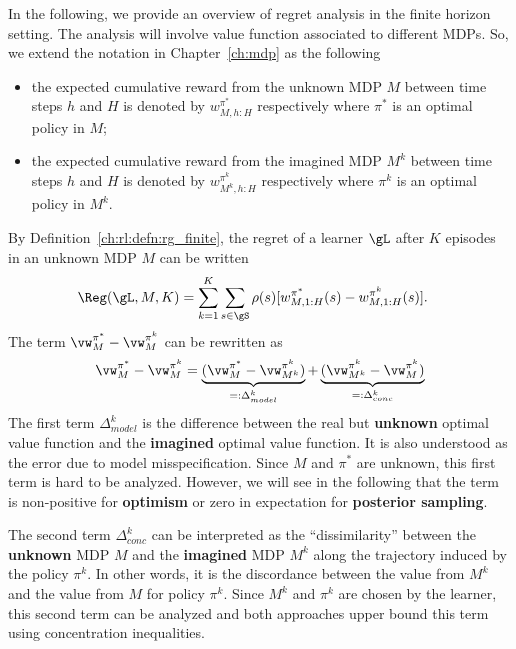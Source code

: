 In the following, we provide an overview of regret analysis in the finite horizon setting. 
The analysis will involve value function associated to different MDPs.
So, we extend the notation in Chapter~\ref{ch:mdp} as the following
\begin{itemize}
    \item the expected cumulative reward from the unknown MDP $M$ between time steps $h$ and $H$ is denoted by $w^{\pi^*}_{M,h:H}$ respectively where $\pi^*$ is an optimal policy in $M$;
    \item the expected cumulative reward from the imagined MDP $M^k$ between time steps $h$ and $H$ is denoted by $w^{\pi^k}_{M^k,h:H}$ respectively where $\pi^k$ is an optimal policy in $M^k$.
\end{itemize}

By Definition~\ref{ch:rl:defn:rg_finite}, the regret of a learner $\gL$ after $K$ episodes in an unknown MDP $M$ can be written
\begin{align*}
    \Reg(\gL, M, K) &= \sum_{k=1}^K\sum_{s\in\gS}\rho(s)[w^{\pi^*}_{M,1:H}(s) -w^{\pi^k}_{M,1:H}(s)].
\end{align*}
The term $\vw^{\pi^*}_M -\vw^{\pi^k}_M$ can be rewritten as
\begin{equation}
    \label{eq:rg_model_conc}
    \vw^{\pi^*}_M -\vw^{\pi^k}_M = \underbrace{(\vw^{\pi^*}_M -\vw^{\pi^k}_{M^k})}_{=:\Delta_{model}^k} +\underbrace{(\vw^{\pi^k}_{M^k} -\vw^{\pi^k}_M)}_{=:\Delta_{conc}^k}
\end{equation}
The first term $\Delta_{model}^k$ is the difference between the real but \textbf{unknown} optimal value function and the \textbf{imagined} optimal value function.
It is also understood as the error due to model misspecification.
Since $M$ and $\pi^*$ are unknown, this first term is hard to be analyzed.
However, we will see in the following that the term is non-positive for \textbf{optimism} or zero in expectation for \textbf{posterior sampling}.

The second term $\Delta_{conc}^k$ can be interpreted as the ``dissimilarity'' between the \textbf{unknown} MDP $M$ and the \textbf{imagined} MDP $M^k$ along the trajectory induced by the policy $\pi^k$.
In other words, it is the discordance between the value from $M^k$ and the value from $M$ for policy $\pi^k$.
Since $M^k$ and $\pi^k$ are chosen by the learner, this second term can be analyzed and both approaches upper bound this term using concentration inequalities.

